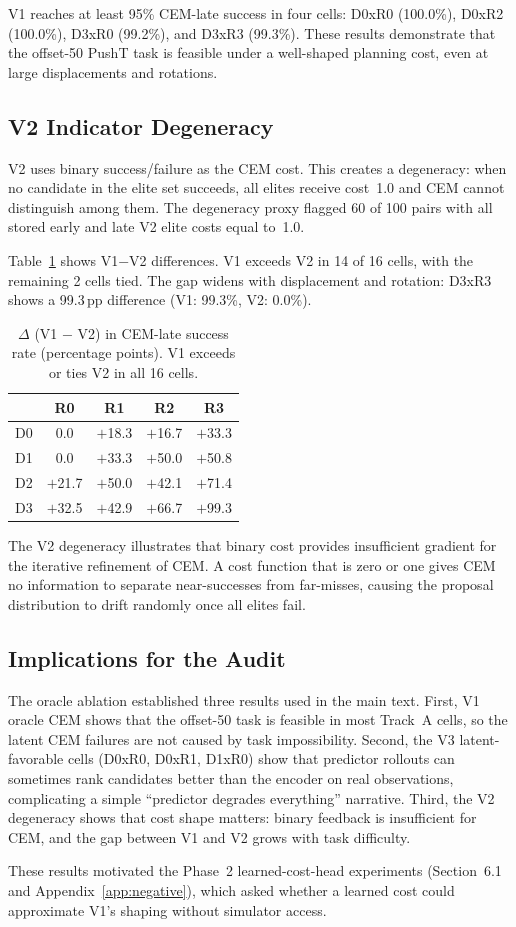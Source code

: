 V1 reaches at least 95\% CEM-late success in four cells: D0xR0 (100.0\%),
D0xR2 (100.0\%), D3xR0 (99.2\%), and D3xR3 (99.3\%).  These results
demonstrate that the offset-50 PushT task is feasible under a well-shaped
planning cost, even at large displacements and rotations.

\subsection{V2 Indicator Degeneracy}
\label{app:v2_degen}

V2 uses binary success/failure as the CEM cost.  This creates a degeneracy:
when no candidate in the elite set succeeds, all elites receive cost~1.0 and
CEM cannot distinguish among them.  The degeneracy proxy flagged 60 of 100
pairs with all stored early and late V2 elite costs equal to~1.0.

Table~\ref{tab:v2-delta} shows V1$-$V2 differences.  V1 exceeds V2 in 14 of
16 cells, with the remaining 2 cells tied.  The gap widens with displacement
and rotation: D3xR3 shows a 99.3\,pp difference (V1: 99.3\%, V2: 0.0\%).

\begin{table}[h]
\centering
\caption{$\Delta$ (V1 $-$ V2) in CEM-late success rate (percentage points).
V1 exceeds or ties V2 in all 16 cells.}
\label{tab:v2-delta}
\begin{tabular}{lcccc}
\toprule
 & R0 & R1 & R2 & R3 \\
\midrule
D0 & 0.0 & $+$18.3 & $+$16.7 & $+$33.3 \\
D1 & 0.0 & $+$33.3 & $+$50.0 & $+$50.8 \\
D2 & $+$21.7 & $+$50.0 & $+$42.1 & $+$71.4 \\
D3 & $+$32.5 & $+$42.9 & $+$66.7 & $+$99.3 \\
\bottomrule
\end{tabular}
\end{table}

The V2 degeneracy illustrates that binary cost provides insufficient
gradient for the iterative refinement of CEM.  A cost function that is zero or
one gives CEM no information to separate near-successes from far-misses,
causing the proposal distribution to drift randomly once all elites fail.

\subsection{Implications for the Audit}

The oracle ablation established three results used in the main text.
First, V1 oracle CEM shows that the offset-50 task is feasible in most
Track~A cells, so the latent CEM failures are not caused by task
impossibility.  Second, the V3 latent-favorable cells (D0xR0, D0xR1, D1xR0)
show that predictor rollouts can sometimes rank candidates better than the
encoder on real observations, complicating a simple ``predictor degrades
everything'' narrative.  Third, the V2 degeneracy shows that cost shape
matters: binary feedback is insufficient for CEM, and the gap between V1 and
V2 grows with task difficulty.

These results motivated the Phase~2 learned-cost-head experiments
(Section~6.1 and Appendix~\ref{app:negative}), which asked whether a learned
cost could approximate V1's shaping without simulator access.
